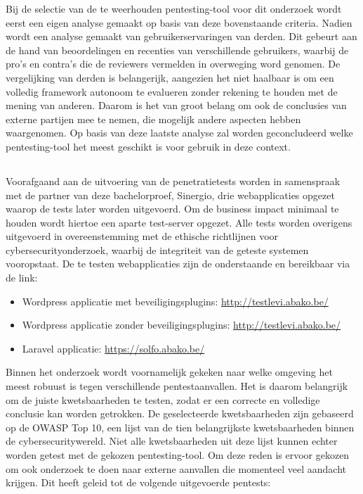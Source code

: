 Bij de selectie van de te weerhouden pentesting-tool voor dit onderzoek wordt eerst een eigen analyse gemaakt op basis van deze bovenstaande criteria. 
Nadien wordt een analyse gemaakt van gebruikerservaringen van derden. Dit gebeurt aan de hand van beoordelingen en recenties van 
verschillende gebruikers, waarbij de pro's en contra's die de reviewers vermelden in overweging word genomen. De vergelijking 
van derden is belangerijk, aangezien het niet haalbaar is om een volledig framework 
autonoom te evalueren zonder rekening te houden met de mening van anderen. Daarom is het van groot belang om ook de conclusies van externe partijen mee te nemen, die mogelijk andere 
aspecten hebben waargenomen. Op basis van 
deze laatste analyse zal worden geconcludeerd welke pentesting-tool het meest geschikt is voor gebruik in deze context.

\subsection{}
Voorafgaand aan de uitvoering van de penetratietests worden in samenspraak met de partner van deze bachelorproef, Sinergio, drie 
webapplicaties opgezet waarop de tests later worden uitgevoerd. Om de business impact minimaal te houden wordt hiertoe een 
aparte test-server opgezet. Alle tests worden overigens uitgevoerd in overeenstemming met de ethische 
richtlijnen voor cybersecurityonderzoek, waarbij de integriteit van de geteste systemen vooropstaat. De te testen 
webapplicaties zijn de onderstaande en bereikbaar via de link:

\begin{itemize}
    \item Wordpress applicatie met beveiligingsplugins: \url{http://testlevi.abako.be/}
    \item Wordpress applicatie zonder beveiligingsplugins: \url{http://testlevi.abako.be/}
    \item Laravel applicatie: \url{https://solfo.abako.be/}
\end{itemize}

Binnen het onderzoek wordt voornamelijk gekeken naar welke omgeving het meest robuust is tegen verschillende pentestaanvallen. 
Het is daarom belangrijk om de juiste kwetsbaarheden te testen, zodat er een correcte en volledige conclusie kan worden 
getrokken. De geselecteerde kwetsbaarheden zijn gebaseerd op de OWASP Top 10, een lijst van de tien belangrijkste 
kwetsbaarheden binnen de cybersecuritywereld. Niet alle kwetsbaarheden uit deze lijst kunnen echter worden getest met de 
gekozen pentesting-tool. Om deze reden is ervoor gekozen om ook onderzoek te doen naar externe aanvallen die momenteel veel 
aandacht krijgen. Dit heeft geleid tot de volgende uitgevoerde pentests:

